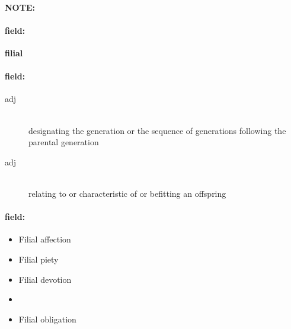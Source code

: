 \documentclass[12pt]{article}
\newenvironment{note}{\paragraph{NOTE:}}{}
\newenvironment{field}{\paragraph{field:}}{}
\begin{document}
\begin{note}
\begin{field}
\textbf{\large filial}
\end{field}


\begin{field}
\begin{description}
\item[adj] \hfill \\ 
designating the generation or the sequence of generations following the parental generation

\item[adj] \hfill \\ 
relating to or characteristic of or befitting an offspring

\end{description}
\end{field}

\begin{field}
\begin{itemize}
\item Filial affection
\item Filial piety
\item Filial devotion
\item 
\item Filial obligation
\end{itemize}
\end{field}
\end{note}
\end{document}

